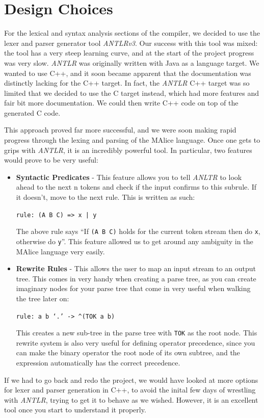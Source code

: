 \documentclass[11pt, notitlepage]{report}
\begin{document}
\section*{Design Choices}
For the lexical and syntax analysis sections of the compiler, we decided to use the lexer and parser generator tool \emph{ANTLRv3}. Our success with this tool was mixed: the tool has a very steep learning curve, and at the start of the project progress was very slow. \emph{ANTLR} was originally written with Java as a language target. We wanted to use C++, and it soon became apparent that the documentation was distinctly lacking for the C++ target. In fact, the \emph{ANTLR} C++ target was so limited that we decided to use the C target instead, which had more features and fair bit more documentation. We could then write C++ code on top of the generated C code.

This approach proved far more successful, and we were soon making rapid progress through the lexing and parsing of the MAlice language. Once one gets to grips with \emph{ANTLR}, it is an incredibly powerful tool. In particular, two features would prove to be very useful:
\begin{itemize}
\item \textbf{Syntactic Predicates} - This feature allows you to tell \emph{ANLTR} to look ahead to the next n tokens and check if the input confirms to this subrule. If it doesn't, move to the next rule. This is written as such:
\begin{center}
	\texttt{rule: (A B C) => x | y}
\end{center}
The above rule says ``If \texttt{(A B C)} holds for the current token stream then do \texttt{x}, otherwise do \texttt{y}''. This feature allowed us to get around any ambiguity in the MAlice language very easily.

\item \textbf{Rewrite Rules} - This allows the user to map an input stream to an output tree. This comes in very handy when creating a parse tree, as you can create imaginary nodes for your parse tree that come in very useful when walking the tree later on:
\begin{center}
	\texttt{rule: a b `.' -> \textasciicircum(TOK a b)}
\end{center}
This creates a new sub-tree in the parse tree with \texttt{TOK} as the root node. This rewrite system is also very useful for defining operator precedence, since you can make the binary operator the root node of its own subtree, and the expression automatically has the correct precedence.
\end{itemize}
If we had to go back and redo the project, we would have looked at more options for lexer and parser generation in C++, to avoid the inital few days of wrestling with \emph{ANTLR}, trying to get it to behave as we wished. However, it is an excellent tool once you start to understand it properly.
\end{document}
